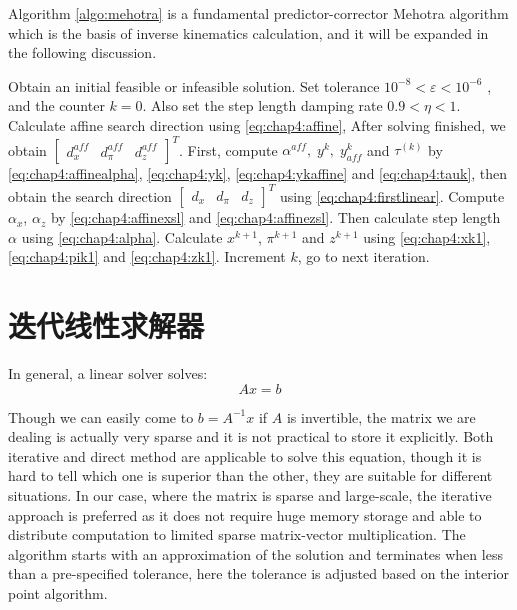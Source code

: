 Algorithm \ref{algo:mehotra} is a fundamental predictor-corrector Mehotra algorithm which is the basis of inverse kinematics calculation, and it will be expanded in the following discussion.
\begin{center}
	\label{algo:mehotra}
	\begin{algorithmic}[1]
		\STATE Obtain an initial feasible or infeasible solution. Set tolerance $10^{-8}<\varepsilon<10^{-6}$ , and the counter $k=0$. Also set the step length damping rate $0.9<\eta<1$.
		\STATE Calculate affine search direction using \eqref{eq:chap4:affine}, After solving finished, we obtain ${\begin{bmatrix}d_x^{aff}& d_\pi^{aff}& d_z^{aff}\end{bmatrix}}^T$. 
		\STATE First, compute ${\alpha}^{aff},\;y^{k},\;y^{k}_{aff}$ and $\tau^{(k)}$ by \eqref{eq:chap4:affinealpha}, \eqref{eq:chap4:yk}, \eqref{eq:chap4:ykaffine} and \eqref{eq:chap4:tauk}, then obtain the search direction $
		{\begin{bmatrix}
			d_x& d_\pi& d_z
			\end{bmatrix}}^T
		$ using \eqref{eq:chap4:firstlinear}.
		\STATE Compute $\alpha_x$, $\alpha_z$ by \eqref{eq:chap4:affinexsl} and \eqref{eq:chap4:affinezsl}. Then calculate step length $\alpha$ using \eqref{eq:chap4:alpha}.
		\STATE Calculate $x^{k+1}$, $\pi^{k+1}$ and $z^{k+1}$ using \eqref{eq:chap4:xk1}, \eqref{eq:chap4:pik1} and \eqref{eq:chap4:zk1}. Increment $k$, go to next iteration.
		\ENDFOR
	\end{algorithmic}
	\vspace{-5pt}\hrulefill
\end{center}
\section{迭代线性求解器}
In general, a linear solver solves:
\begin{equation}
Ax=b
\end{equation}

Though we can easily come to $b=A^{-1}x$ if $A$ is invertible, the matrix we are dealing is actually very sparse and it is not practical to store it explicitly. Both iterative and direct method are applicable to solve this equation, though it is hard to tell which one is superior than the other, they are suitable for different situations. In our case, where the matrix is sparse and large-scale, the iterative approach is preferred as it does not require huge memory storage and able to distribute computation to limited sparse matrix-vector multiplication. The algorithm starts with an approximation of the solution and terminates when less than a pre-specified tolerance, here the tolerance is adjusted based on the interior point algorithm. 

